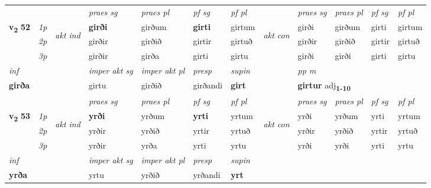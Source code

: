 \begin{longtable}[l]{X>{\footnotesize\itshape}llXXXXlXXXX}
 & &   & \textit{praes sg}  & \textit{praes pl}    & \textit{ pf sg} & \textit{pf pl} & & \textit{praes sg}  & \textit{praes pl}    & \textit{pf sg} & \textit{pf pl }  \\ \cmidrule{4-7} \cmidrule{9-12}
 \multirow{2}{*}{{{\textbf{v{\textsubscript{2}}} \Large{\textbf{52}}}}}  & 1p & \multirow{3}{*}{\begin{turn}{90}\textit{akt ind}\end{turn}} & \textbf{girði} & girðum & \textbf{girti} & girtum & \multirow{3}{*}{\begin{turn}{90}\textit{akt con}\end{turn}} &girði & girðum & girti & girtum\\*
 & 2p &  &  girðir  & girðið & girtir & girtuð & & girðir & girðið & girtir & girtuð \\*
 & 3p &  & girðir & girða & girti & girtu & & girði & girði& girti & girtu \\*
\cmidrule{4-7} \cmidrule{9-12}

   {\textit{inf}} & &  & \textit{imper akt sg} & \textit{imper akt pl}   & \textit{presp} & \textit{supin}  && \textit{pp m} \\*
  {\textbf{girða}} & && girtu  & girðið   & girðandi &  \textbf{girt}  && \multicolumn{2}{l}{\textbf{girtur} adj\textbf{\textsubscript{1-10}}} \\*

\midrule

 & &   & \textit{praes sg}  & \textit{praes pl}    & \textit{ pf sg} & \textit{pf pl} & & \textit{praes sg}  & \textit{praes pl}    & \textit{pf sg} & \textit{pf pl }  \\ \cmidrule{4-7} \cmidrule{9-12}
 \multirow{2}{*}{{{\textbf{v{\textsubscript{2}}} \Large{\textbf{53}}}}}  & 1p & \multirow{3}{*}{\begin{turn}{90}\textit{akt ind}\end{turn}} & \textbf{yrði} & yrðum & \textbf{yrti} & yrtum & \multirow{3}{*}{\begin{turn}{90}\textit{akt con}\end{turn}} &yrði & yrðum & yrti & yrtum\\*
 & 2p &  &  yrðir  & yrðið & yrtir & yrtuð & & yrðir & yrðið & yrtir & yrtuð \\*
 & 3p &  & yrðir & yrða & yrti & yrtu & & yrði & yrði& yrti & yrtu \\*
\cmidrule{4-7} \cmidrule{9-12}

   {\textit{inf}} & &  & \textit{imper akt sg} & \textit{imper akt pl}   & \textit{presp} & \textit{supin}   \\*
  {\textbf{yrða}} & && yrtu  & yrðið   & yrðandi &  \textbf{yrt}   \\*


\end{longtable}
